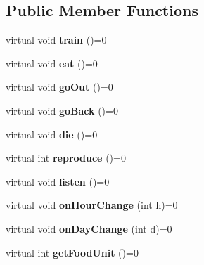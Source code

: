 \subsection*{Public Member Functions}
\begin{DoxyCompactItemize}
\item 
\mbox{\label{class_intelligence_animal_a3d1742ff1c76aed9394748f11d5d8789}} 
virtual void {\bfseries train} ()=0
\item 
\mbox{\label{class_intelligence_animal_aeb924c39e9496e3775b0ef2af35c638f}} 
virtual void {\bfseries eat} ()=0
\item 
\mbox{\label{class_intelligence_animal_af58201f17c0847f0a92154462d1fa627}} 
virtual void {\bfseries go\+Out} ()=0
\item 
\mbox{\label{class_intelligence_animal_aa09abbbe91dddc5e37a01d17bc5423e2}} 
virtual void {\bfseries go\+Back} ()=0
\item 
\mbox{\label{class_intelligence_animal_ada72ecbbe6cfcbdf7be0000915f0b69e}} 
virtual void {\bfseries die} ()=0
\item 
\mbox{\label{class_intelligence_animal_ab8374471442da78816c4f082a907b881}} 
virtual int {\bfseries reproduce} ()=0
\item 
\mbox{\label{class_intelligence_animal_aeb33e78d2fa3b5f2e5ef84f5baf916f7}} 
virtual void {\bfseries listen} ()=0
\item 
\mbox{\label{class_intelligence_animal_a9bc1ebd1a95082178b3e83dbeee16415}} 
virtual void {\bfseries on\+Hour\+Change} (int h)=0
\item 
\mbox{\label{class_intelligence_animal_a7a96244e5e54f37649c27513af122983}} 
virtual void {\bfseries on\+Day\+Change} (int d)=0
\item 
\mbox{\label{class_intelligence_animal_a6d5904db3250bd5b94234705abc5b7bb}} 
virtual int {\bfseries get\+Food\+Unit} ()=0
\end{DoxyCompactItemize}
